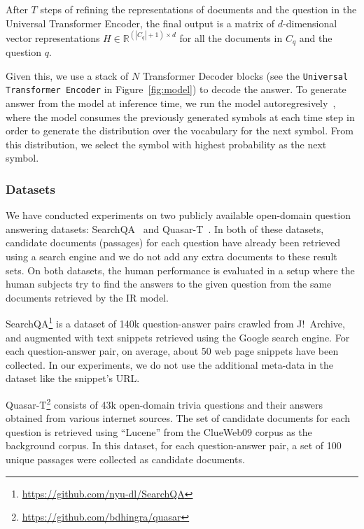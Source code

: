After $T$ steps of refining the representations of documents and the question in the Universal Transformer Encoder, the final output is a matrix of $d$-dimensional vector representations $H \in \mathbb{R}^{(|C_q|+1) \times d}$ for all the documents in $C_q$ and the question $q$.

Given this, we use a stack of $N$ Transformer Decoder blocks (see  the \texttt{Universal Transformer Encoder} in Figure~\ref{fig:model}) to decode the answer.
To generate answer from the model at inference time, we run the model autoregresively~\citep{graves2013generating}, where the model consumes the previously generated symbols at each time step in order to generate the distribution over the vocabulary for the next symbol. From this distribution, we select the symbol with highest probability as the next symbol.   


\subsubsection{Datasets}
We have conducted experiments on two publicly available open-domain question answering datasets: SearchQA~\citep{dunn2017searchqa} and Quasar-T~\citep{dhingra2017quasar}. 
In both of these datasets, candidate documents (passages) for each question have already been retrieved using a search engine and we do not add any extra documents to these result sets. 
On both datasets, the human performance is evaluated in a setup where the human subjects try to find the answers to the given question from the same documents retrieved by the IR model.

SearchQA\footnote{\url{https://github.com/nyu-dl/SearchQA}} is a dataset of 140k question-answer pairs crawled from J!\ Archive, and augmented with text snippets retrieved using the Google search engine. 
For each question-answer pair, on average, about 50 web page snippets have been collected. 
In our experiments, we do not use the additional meta-data in the dataset like the snippet's URL.

Quasar-T\footnote{\url{https://github.com/bdhingra/quasar}} consists of 43k open-domain trivia questions and their answers obtained from various internet sources. 
The set of candidate documents for each question is retrieved using ``Lucene'' from the ClueWeb09 corpus as the background corpus. 
In this dataset, for each question-answer pair, a set of 100 unique passages were collected as candidate documents.

